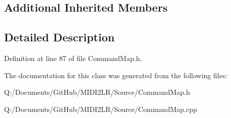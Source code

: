 \subsection*{Additional Inherited Members}


\subsection{Detailed Description}


Definition at line 87 of file Command\+Map.\+h.



The documentation for this class was generated from the following files\+:\begin{DoxyCompactItemize}
\item 
Q\+:/\+Documents/\+Git\+Hub/\+M\+I\+D\+I2\+L\+R/\+Source/Command\+Map.\+h\item 
Q\+:/\+Documents/\+Git\+Hub/\+M\+I\+D\+I2\+L\+R/\+Source/Command\+Map.\+cpp\end{DoxyCompactItemize}
